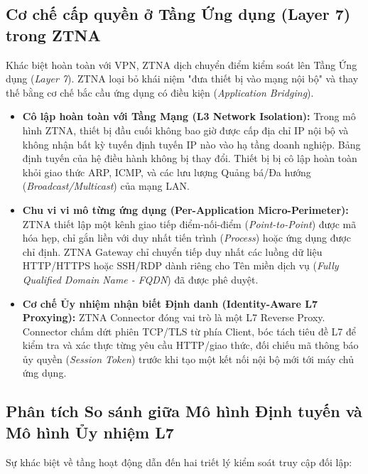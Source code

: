 \subsection{Cơ chế cấp quyền ở Tầng Ứng dụng (Layer 7) trong ZTNA}
\label{subsec:4_1_2}

Khác biệt hoàn toàn với VPN, ZTNA dịch chuyển điểm kiểm soát lên Tầng Ứng dụng (\textit{Layer 7}). ZTNA loại bỏ khái niệm "đưa thiết bị vào mạng nội bộ" và thay thế bằng cơ chế bắc cầu ứng dụng có điều kiện (\textit{Application Bridging}).

\begin{itemize}
    \item \textbf{Cô lập hoàn toàn với Tầng Mạng (L3 Network Isolation):} Trong mô hình ZTNA, thiết bị đầu cuối không bao giờ được cấp địa chỉ IP nội bộ và không nhận bất kỳ tuyến định tuyến IP nào vào hạ tầng doanh nghiệp. Bảng định tuyến của hệ điều hành không bị thay đổi. Thiết bị bị cô lập hoàn toàn khỏi giao thức ARP, ICMP, và các lưu lượng Quảng bá/Đa hướng (\textit{Broadcast/Multicast}) của mạng LAN.
    \item \textbf{Chu vi vi mô từng ứng dụng (Per-Application Micro-Perimeter):} ZTNA thiết lập một kênh giao tiếp điểm-nối-điểm (\textit{Point-to-Point}) được mã hóa hẹp, chỉ gắn liền với duy nhất tiến trình (\textit{Process}) hoặc ứng dụng được chỉ định. ZTNA Gateway chỉ chuyển tiếp duy nhất các luồng dữ liệu HTTP/HTTPS hoặc SSH/RDP dành riêng cho Tên miền dịch vụ (\textit{Fully Qualified Domain Name - FQDN}) đã được phê duyệt.
    \item \textbf{Cơ chế Ủy nhiệm nhận biết Định danh (Identity-Aware L7 Proxying):} ZTNA Connector đóng vai trò là một L7 Reverse Proxy. Connector chấm dứt phiên TCP/TLS từ phía Client, bóc tách tiêu đề L7 để kiểm tra và xác thực từng yêu cầu HTTP/giao thức, đối chiếu mã thông báo ủy quyền (\textit{Session Token}) trước khi tạo một kết nối nội bộ mới tới máy chủ ứng dụng.
\end{itemize}

\subsection{Phân tích So sánh giữa Mô hình Định tuyến và Mô hình Ủy nhiệm L7}
\label{subsec:4_1_3}

Sự khác biệt về tầng hoạt động dẫn đến hai triết lý kiểm soát truy cập đối lập:

